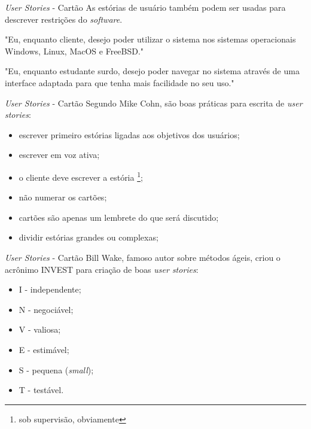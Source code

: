 \documentclass[11pt]{beamer}
\begin{document}
    \begin{frame}{\textit{User Stories} - Cartão}
       As estórias de usuário também podem ser usadas para descrever restrições do \textit{software}.
\vspace{1cm}       

       "Eu, enquanto cliente, desejo poder utilizar o sistema nos sistemas operacionais Windows, Linux, MacOS e FreeBSD."
\vspace{1cm}
       
       "Eu, enquanto estudante surdo, desejo poder navegar no sistema através de uma interface adaptada para que tenha mais facilidade no seu uso."
   \end{frame}

   \begin{frame}{\textit{User Stories} - Cartão}
      Segundo Mike Cohn, são boas práticas para escrita de \textit{user stories}:
      \begin{itemize}
         \item escrever primeiro estórias ligadas aos objetivos dos usuários;
         \item escrever em voz ativa;
         \item o cliente deve escrever a estória \footnote{sob supervisão, obviamente};
         \item não numerar os cartões;
         \item cartões são apenas um lembrete do que será discutido;
         \item dividir estórias grandes ou complexas;
      \end{itemize}
   \end{frame}

   \begin{frame}{\textit{User Stories} - Cartão}
      Bill Wake, famoso autor sobre métodos ágeis, criou o acrônimo INVEST para criação de boas \textit{user stories}:
      \begin{itemize}
         \item I - independente;
         \item N - negociável;
         \item V - valiosa;
         \item E - estimável;
         \item S - pequena (\textit{small});
         \item T - testável.
      \end{itemize}
   \end{frame}
\end{document}
